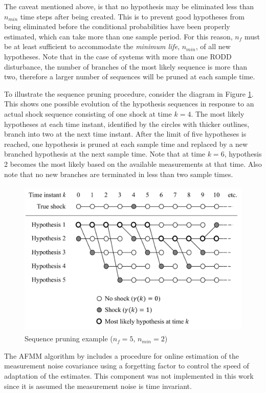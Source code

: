 The caveat mentioned above, is that no hypothesis may be eliminated less than $n_{min}$ time steps after being created. This is to prevent good hypotheses from being eliminated before the conditional probabilities have been properly estimated, which can take more than one sample period. For this reason, $n_f$ must be at least sufficient to accommodate the \textit{minimum life}, $n_{min}$, of all new hypotheses. Note that in the case of systems with more than one RODD disturbance, the number of branches of the most likely sequence is more than two, therefore a larger number of sequences will be pruned at each sample time.

To illustrate the sequence pruning procedure, consider the diagram in Figure \ref{fig:mm-obs-seq-erik}. This shows one possible evolution of the hypothesis sequences in response to an actual shock sequence consisting of one shock at time $k=4$.  The most likely hypotheses at each time instant, identified by the circles with thicker outlines, branch into two at the next time instant. After the limit of five hypotheses is reached, one hypothesis is pruned at each sample time and replaced by a new branched hypothesis at the next sample time. Note that at time $k=6$, hypothesis 2 becomes the most likely based on the available measurements at that time. Also note that no new branches are terminated in less than two sample times.

\begin{figure}[htp]
	\centering
	\includegraphics[height=7.5cm]{images/mm_obs_seq_erik.pdf}
	\caption{Sequence pruning example ($n_f=5$, $n_{min}=2$)}
	\label{fig:mm-obs-seq-erik}
\end{figure}

The AFMM algorithm by \cite{gustafsson_estimation_1993} includes a procedure for online estimation of the measurement noise covariance using a forgetting factor to control the speed of adaptation of the estimates. This component was not implemented in this work since it is assumed the measurement noise is time invariant.

